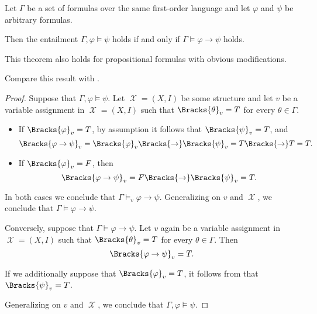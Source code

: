 \begin{theorem}\label{thm:semantic_deduction_theorem}
  Let \( \Gamma \) be a set of formulas over the same first-order language and let \( \varphi \) and \( \psi \) be arbitrary formulas.

  Then the entailment \( \Gamma, \varphi \vDash \psi \) holds if and only if \( \Gamma \vDash \varphi \to \psi \) holds.
\end{theorem}
\begin{comments}
  \item This theorem also holds for propositional formulas with obvious modifications.
  \item Compare this result with .
\end{comments}
\begin{proof}
  \SufficiencySubProof Suppose that \( \Gamma, \varphi \vDash \psi \). Let \( \mscrX = (X, I) \) be some structure and let \( v \) be a variable assignment in \( \mscrX = (X, I) \) such that \( \Bracks{\theta}_v = T \) for every \( \theta \in \Gamma \).

  \begin{itemize}
    \item If \( \Bracks{\varphi}_v = T \), by assumption it follows that \( \Bracks{\psi}_v = T \), and
    \begin{equation*}
      \Bracks{\varphi \rightarrow \psi}_v
      =
      \Bracks{\varphi}_v \Bracks{\rightarrow} \Bracks{\psi}_v
      =
      T \Bracks{\rightarrow} T
      =
      T.
    \end{equation*}

    \item If \( \Bracks{\varphi}_v = F \), then
    \begin{equation*}
      \Bracks{\varphi \rightarrow \psi}_v
      =
      F \Bracks{\rightarrow} \Bracks{\psi}_v
      =
      T.
    \end{equation*}
  \end{itemize}

  In both cases we conclude that \( \Gamma \vDash_v \varphi \rightarrow \psi \). Generalizing on \( v \) and \( \mscrX \), we conclude that \( \Gamma \vDash \varphi \rightarrow \psi \).

  \NecessitySubProof Conversely, suppose that \( \Gamma \vDash \varphi \rightarrow \psi \). Let \( v \) again be a variable assignment in \( \mscrX = (X, I) \) such that \( \Bracks{\theta}_v = T \) for every \( \theta \in \Gamma \). Then
  \begin{equation*}
    \Bracks{\varphi \rightarrow \psi}_v = T.
  \end{equation*}

  If we additionally suppose that \( \Bracks{\varphi}_v = T \), it follows from  that \( \Bracks{\psi}_v = T \).

  Generalizing on \( v \) and \( \mscrX \), we conclude that \( \Gamma, \varphi \vDash \psi \).
\end{proof}
